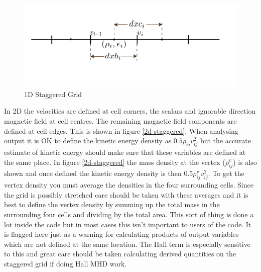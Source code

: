 \documentclass[11pt]{article}
\begin{document}
\begin{figure}
\begin{center}
  \includegraphics{1d-staggered-grid.pdf}
\caption{1D Staggered Grid}
\end{center}
\label{1d-staggered}
\end{figure}

In 2D the velocities are defined at cell corners, the scalars and ignorable direction magnetic field at cell centres. 
The remaining magnetic field components are defined at cell edges. This is shown in figure \ref{2d-staggered}. When 
analysing output it is OK to define the kinetic energy density as $0.5\rho_{ij}v_{ij}^2$ but the accurate estimate of 
kinetic energy should make sure that these variables are defined at the same place. In figure \ref{2d-staggered} the 
mass density at the vertex ($\rho_{ij}^v$) is also shown and once defined the kinetic energy density is then  
$0.5\rho_{ij}^v v_{ij}^2$. To get the vertex density you must average the densities in the four surrounding cells. 
Since the grid is possibly stretched care should be taken with these averages and it is best to define the vertex 
density by summing up the total mass in the surrounding four cells and dividing by the total area. This sort of thing 
is done a lot inside the code but in most cases this isn't important to users of the code. It is flagged here just 
as a warning for calculating products of output variables which are not defined at the same location. The Hall term 
is especially sensitive to this and great care should be taken calculating derived quantities on the staggered grid if doing Hall MHD work.
\end{document}
